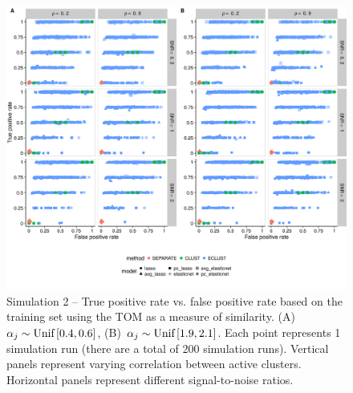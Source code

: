 \begin{appendices}
\begin{figure}
	\includegraphics[scale=0.57, keepaspectratio]{./figs/hydra/results/figures/sim2-sept8/tpr_fpr_TOM_sim2.png}
	\caption{Simulation 2 -- True positive rate vs. false positive rate based on the training set using the TOM as a measure of similarity. \mbox{(A) $\alpha_{j} \sim \textrm{{Unif}}\left[0.4, 0.6\right]$}, \mbox{(B) $\alpha_{j} \sim \textrm{{Unif}}\left[1.9, 2.1\right]$}. Each point represents 1 simulation run (there are a total of 200 simulation runs). Vertical panels represent varying correlation between active clusters. Horizontal panels represent different signal-to-noise ratios.}
	\label{fig:tpr_fpr_TOM_sim2}
\end{figure}




\end{appendices}
